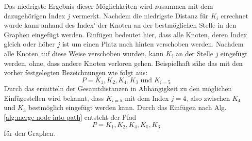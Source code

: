 Das niedrigste Ergebnis dieser Möglichkeiten wird zusammen mit dem dazugehörigen Index $j$ vermerkt. 
Nachdem die niedrigste Distanz für $K_i$ errechnet wurde kann anhand des Index' der Knoten an der bestmöglichen Stelle in den Graphen eingefügt werden. 
Einfügen bedeutet hier, dass alle Knoten, deren Index gleich oder höher $j$ ist um einen Platz nach hinten verschoben werden. 
Nachdem alle Knoten auf diese Weise verschoben wurden, kann $K_i$ an der Stelle $j$ eingefügt werden, ohne, dass andere Knoten verloren gehen. 
Beispielhaft sähe das mit den vorher festgelegten Bezeichnungen wie folgt aus: 
$$P= K_1, K_2, K_4, K_3 \textrm{ und } K_{i = 5}$$ 
Durch das ermitteln der Gesamtdistanzen in Abhängigkeit zu den möglichen Einfügestellen wird bekannt, dass $K_{i=5}$ mit dem Index $j=4$, also zwischen $K_4$ und $K_3$ bestmöglich eingefügt werden kann. 
Durch das Einfügen nach \ac{Alg.} \vref{alg:merge-node-into-path} entsteht der Pfad
$$P=K_1, K_2, K_4, K_5, K_3$$
für den Graphen.

